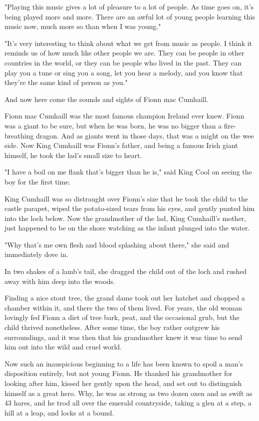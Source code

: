 "Playing this music gives a lot of pleasure to a lot of people. As time goes on, it's being played more and more. There are an awful lot of young people learning this music now, much more so than when I was young."

"It's very interesting to think about what we get from music as people. I think it reminds us of how much like other people we are. They can be people in other countries in the world, or they can be people who lived in the past. They can play you a tune or sing you a song, let you hear a melody, and you know that they're the same kind of person as you."

And now here come the sounds and sights of Fionn mac Cumhaill.

Fionn mac Cumhaill was the most famous champion Ireland ever knew. Fionn was a giant to be sure, but when he was born, he was no bigger than a fire-breathing dragon. And as giants went in those days, that was a might on the wee side. Now King Cumhaill was Fionn's father, and being a famous Irish giant himself, he took the lad's small size to heart.

"I have a boil on me flank that's bigger than he is," said King Cool on seeing the boy for the first time.

King Cumhaill was so distraught over Fionn's size that he took the child to the castle parapet, wiped the potato-sized tears from his eyes, and gently punted him into the loch below. Now the grandmother of the lad, King Cumhaill's mother, just happened to be on the shore watching as the infant plunged into the water.

"Why that's me own flesh and blood splashing about there," she said and immediately dove in.

In two shakes of a lamb's tail, she dragged the child out of the loch and rushed away with him deep into the woods.

Finding a nice stout tree, the grand dame took out her hatchet and chopped a chamber within it, and there the two of them lived. For years, the old woman lovingly fed Fionn a diet of tree bark, peat, and the occasional grub, but the child thrived nonetheless. After some time, the boy rather outgrew his surroundings, and it was then that his grandmother knew it was time to send him out into the wild and cruel world.

Now such an inauspicious beginning to a life has been known to spoil a man's disposition entirely, but not young Fionn. He thanked his grandmother for looking after him, kissed her gently upon the head, and set out to distinguish himself as a great hero. Why, he was as strong as two dozen oxen and as swift as 43 hares, and he trod all over the emerald countryside, taking a glen at a step, a hill at a leap, and locks at a bound.

